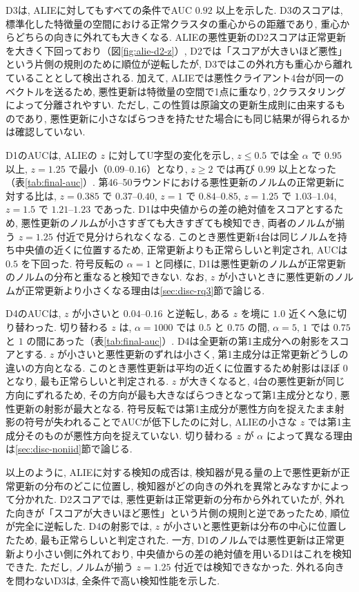 \documentclass[a4j, twocolumn, dvipdfmx]{jsarticle}
\begin{document}
D3は, ALIEに対してもすべての条件でAUC $0.92$ 以上を示した. D3のスコアは, 標準化した特徴量の空間における正常クラスタの重心からの距離であり, 重心からどちらの向きに外れても大きくなる. ALIEの悪性更新のD2スコアは正常更新を大きく下回っており（図\ref{fig:alie-d2-z}）, D2では「スコアが大きいほど悪性」という片側の規則のために順位が逆転したが, D3ではこの外れ方も重心から離れていることとして検出される. 加えて, ALIEでは悪性クライアント4台が同一のベクトルを送るため, 悪性更新は特徴量の空間で1点に重なり, 2クラスタリングによって分離されやすい. ただし, この性質は原論文の更新生成則に由来するものであり, 悪性更新に小さなばらつきを持たせた場合にも同じ結果が得られるかは確認していない.

D1のAUCは, ALIEの $z$ に対してU字型の変化を示し, $z \le 0.5$ では全 $\alpha$ で $0.95$ 以上, $z=1.25$ で最小（$0.09$--$0.16$）となり, $z \ge 2$ では再び $0.99$ 以上となった（表\ref{tab:final-auc}）. 第46--50ラウンドにおける悪性更新のノルムの正常更新に対する比は, $z=0.385$ で $0.37$--$0.40$, $z=1$ で $0.84$--$0.85$, $z=1.25$ で $1.03$--$1.04$, $z=1.5$ で $1.21$--$1.23$ であった. D1は中央値からの差の絶対値をスコアとするため, 悪性更新のノルムが小さすぎても大きすぎても検知でき, 両者のノルムが揃う $z=1.25$ 付近で見分けられなくなる. このとき悪性更新4台は同じノルムを持ち中央値の近くに位置するため, 正常更新よりも正常らしいと判定され, AUCは $0.5$ を下回った. 符号反転の $\alpha=1$ と同様に, D1は悪性更新のノルムが正常更新のノルムの分布と重なると検知できない. なお, $z$ が小さいときに悪性更新のノルムが正常更新より小さくなる理由は\ref{sec:disc-rq3}節で論じる.

D4のAUCは, $z$ が小さいと $0.04$--$0.16$ と逆転し, ある $z$ を境に $1.0$ 近くへ急に切り替わった. 切り替わる $z$ は, $\alpha=1000$ では $0.5$ と $0.75$ の間, $\alpha=5,\,1$ では $0.75$ と $1$ の間にあった（表\ref{tab:final-auc}）. D4は全更新の第1主成分への射影をスコアとする. $z$ が小さいと悪性更新のずれは小さく, 第1主成分は正常更新どうしの違いの方向となる. このとき悪性更新は平均の近くに位置するため射影はほぼ $0$ となり, 最も正常らしいと判定される. $z$ が大きくなると, 4台の悪性更新が同じ方向にずれるため, その方向が最も大きなばらつきとなって第1主成分となり, 悪性更新の射影が最大となる. 符号反転では第1主成分が悪性方向を捉えたまま射影の符号が失われることでAUCが低下したのに対し, ALIEの小さな $z$ では第1主成分そのものが悪性方向を捉えていない. 切り替わる $z$ が $\alpha$ によって異なる理由は\ref{sec:disc-noniid}節で論じる.

以上のように, ALIEに対する検知の成否は, 検知器が見る量の上で悪性更新が正常更新の分布のどこに位置し, 検知器がどの向きの外れを異常とみなすかによって分かれた. D2スコアでは, 悪性更新は正常更新の分布から外れていたが, 外れた向きが「スコアが大きいほど悪性」という片側の規則と逆であったため, 順位が完全に逆転した. D4の射影では, $z$ が小さいと悪性更新は分布の中心に位置したため, 最も正常らしいと判定された. 一方, D1のノルムでは悪性更新は正常更新より小さい側に外れており, 中央値からの差の絶対値を用いるD1はこれを検知できた. ただし, ノルムが揃う $z=1.25$ 付近では検知できなかった. 外れる向きを問わないD3は, 全条件で高い検知性能を示した.
\end{document}
